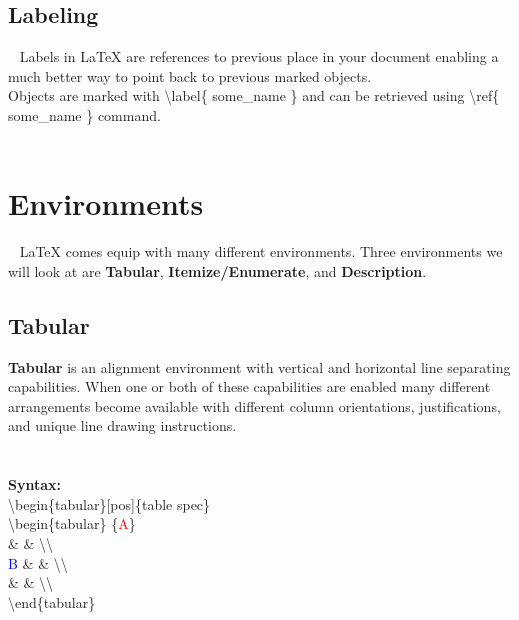 \subsection{Labeling} ~\cite{wiki_books_labels_cross}
Labels in \LaTeX{} are references to previous place in your 
document enabling a much better way to point back to previous 
marked objects. \\

Objects are marked with \textbackslash{label}\{ some\_name \} 
and can be retrieved using \textbackslash{ref}\{ some\_name \} 
command. \\ 

\\



\section{Environments} ~\cite{wiki_tables}
\LaTeX{} comes equip with many different environments. Three 
environments we will look at are {\color{blue}\textbf{Tabular}},
{\color{blue}\textbf{Itemize/Enumerate}}, and 
{\color{blue}\textbf{Description}}. ~\cite{wiki_tables} \\

\subsection{Tabular} 
\textbf{Tabular} is an alignment environment with vertical
and horizontal line separating capabilities. When one or both 
of these capabilities are enabled many different arrangements
become available with different column orientations, justifications,
and unique line drawing instructions. ~\cite{aj_roberts}\\
\mbox{}\\
\mbox{}\\
\textbf{Syntax:}\\  
\textbackslash{begin}\{tabular\}[pos]\{table spec\} \\
    \textbackslash{begin}\{tabular\} \{\textcolor{red}{A}\}\\
        \&  \&  \textbackslash\textbackslash \\
    \textcolor{blue}{B}    \&  \&  \textbackslash\textbackslash \\
        \&  \&  \textbackslash\textbackslash \\
    \textbackslash{end}\{tabular\}\\
    
